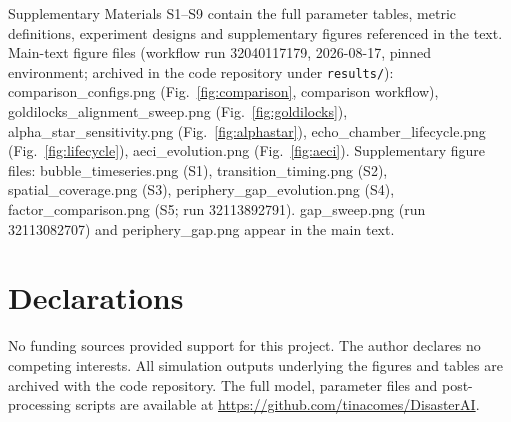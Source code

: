 \documentclass[pdflatex,sn-nature]{sn-jnl}
\begin{document}
\backmatter

Supplementary Materials S1--S9 contain the full parameter tables, metric definitions, experiment designs and supplementary figures referenced in the text. Main-text figure files (workflow run 32040117179, 2026-08-17, pinned environment; archived in the code repository under \texttt{results/}): comparison\_configs.png (Fig.~\ref{fig:comparison}, comparison workflow), goldilocks\_alignment\_sweep.png (Fig.~\ref{fig:goldilocks}), alpha\_star\_sensitivity.png (Fig.~\ref{fig:alphastar}), echo\_chamber\_lifecycle.png (Fig.~\ref{fig:lifecycle}), aeci\_evolution.png (Fig.~\ref{fig:aeci}). Supplementary figure files: bubble\_timeseries.png (S1), transition\_timing.png (S2), spatial\_coverage.png (S3), periphery\_gap\_evolution.png (S4), factor\_comparison.png (S5; run 32113892791). gap\_sweep.png (run 32113082707) and periphery\_gap.png appear in the main text.


\section*{Declarations}

 No funding sources provided support for this project.
 The author declares no competing interests.
 All simulation outputs underlying the figures and tables are archived with the code repository.
 The full model, parameter files and post-processing scripts are available at \url{https://github.com/tinacomes/DisasterAI}.


\end{document}
